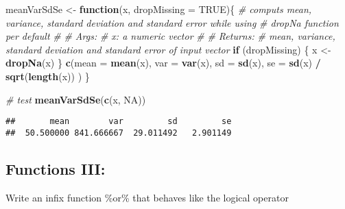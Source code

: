 \documentclass[12,]{article}
\newenvironment{Shaded}{\begin{snugshade}}{\end{snugshade}}
\newcommand{\KeywordTok}[1]{\textcolor[rgb]{0.13,0.29,0.53}{\textbf{#1}}}
\newcommand{\DataTypeTok}[1]{\textcolor[rgb]{0.13,0.29,0.53}{#1}}
\newcommand{\StringTok}[1]{\textcolor[rgb]{0.31,0.60,0.02}{#1}}
\newcommand{\CommentTok}[1]{\textcolor[rgb]{0.56,0.35,0.01}{\textit{#1}}}
\newcommand{\OtherTok}[1]{\textcolor[rgb]{0.56,0.35,0.01}{#1}}
\newcommand{\ControlFlowTok}[1]{\textcolor[rgb]{0.13,0.29,0.53}{\textbf{#1}}}
\newcommand{\OperatorTok}[1]{\textcolor[rgb]{0.81,0.36,0.00}{\textbf{#1}}}
\newcommand{\NormalTok}[1]{#1}
\begin{document}
\begin{Shaded}
\begin{Highlighting}[]
\NormalTok{meanVarSdSe <-}\StringTok{ }\ControlFlowTok{function}\NormalTok{(x, }\DataTypeTok{dropMissing =} \OtherTok{TRUE}\NormalTok{)\{}
  \CommentTok{# computs mean, variance, standard deviation and standard error while using }
  \CommentTok{# dropNa function per default}
  \CommentTok{#}
  \CommentTok{# Args:}
  \CommentTok{#   x: a numeric vector}
  \CommentTok{#}
  \CommentTok{# Returns:}
  \CommentTok{#   mean, variance, standard deviation and standard error of input vector}
  \ControlFlowTok{if}\NormalTok{ (dropMissing) \{}
\NormalTok{    x <-}\StringTok{ }\KeywordTok{dropNa}\NormalTok{(x)}
\NormalTok{  \}}
  \KeywordTok{c}\NormalTok{(}\DataTypeTok{mean =} \KeywordTok{mean}\NormalTok{(x),}
    \DataTypeTok{var =} \KeywordTok{var}\NormalTok{(x),}
    \DataTypeTok{sd =} \KeywordTok{sd}\NormalTok{(x),}
    \DataTypeTok{se =} \KeywordTok{sd}\NormalTok{(x) }\OperatorTok{/}\StringTok{ }\KeywordTok{sqrt}\NormalTok{(}\KeywordTok{length}\NormalTok{(x))}
\NormalTok{  )}
\NormalTok{\}}

\CommentTok{# test}
\KeywordTok{meanVarSdSe}\NormalTok{(}\KeywordTok{c}\NormalTok{(x, }\OtherTok{NA}\NormalTok{))}
\end{Highlighting}
\end{Shaded}

\begin{verbatim}
##       mean        var         sd         se
##  50.500000 841.666667  29.011492   2.901149
\end{verbatim}

\subsection{Functions III:}\label{functions-iii}

Write an infix function \%or\% that behaves like the logical operator
\textbar{}

\begin{Shaded}
\end{Shaded}
\end{document}
